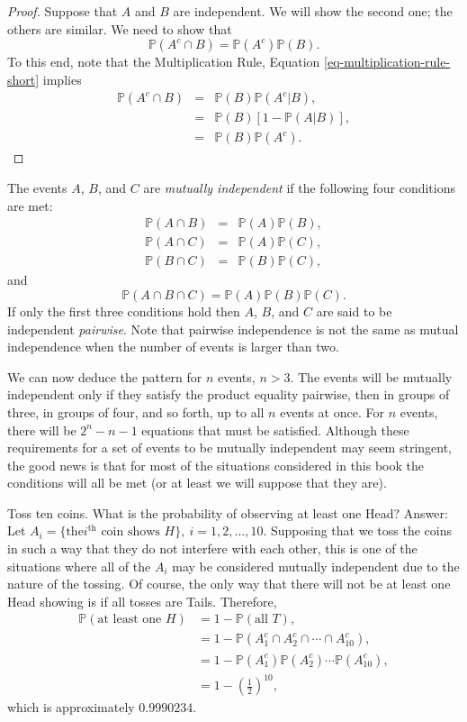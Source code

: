 \begin{proof}
Suppose that \(A\) and \(B\) are independent. We will show the second
one; the others are similar. We need to show that \[
\mathbb{P}(A^{c}\cap B)=\mathbb{P}(A^{c})\mathbb{P}(B).  \] To this
end, note that the Multiplication Rule, Equation
\eqref{eq-multiplication-rule-short} implies
\begin{eqnarray*}
\mathbb{P}(A^{c}\cap B) & = & \mathbb{P}(B)\mathbb{P}(A^{c}|B),\\
 & = & \mathbb{P}(B)[1-\mathbb{P}(A|B)],\\
 & = & \mathbb{P}(B)\mathbb{P}(A^{c}).
\end{eqnarray*}
\end{proof}

\begin{defn}
The events \(A\), \(B\), and \(C\) are \emph{mutually independent} if the
following four conditions are met:
\begin{eqnarray*}
\mathbb{P}(A\cap B) & = & \mathbb{P}(A)\mathbb{P}(B),\\
\mathbb{P}(A\cap C) & = & \mathbb{P}(A)\mathbb{P}(C),\\
\mathbb{P}(B\cap C) & = & \mathbb{P}(B)\mathbb{P}(C),
\end{eqnarray*}
and
\[
\mathbb{P}(A\cap B\cap C)=\mathbb{P}(A)\mathbb{P}(B)\mathbb{P}(C).
\]
If only the first three conditions hold then \(A\), \(B\), and \(C\)
are said to be independent \emph{pairwise}. Note that pairwise independence
is not the same as mutual independence when the number of events is
larger than two.
\end{defn}

We can now deduce the pattern for \(n\) events, \(n>3\). The events
will be mutually independent only if they satisfy the product equality
pairwise, then in groups of three, in groups of four, and so forth, up
to all \(n\) events at once. For \(n\) events, there will be
\(2^{n}-n-1\) equations that must be satisfied.
Although these requirements for a set of events to
be mutually independent may seem stringent, the good news is that for
most of the situations considered in this book the conditions will all
be met (or at least we will suppose that they are).

\label{exa-toss-ten-coins} Toss ten coins. What is the probability of
observing at least one Head? Answer: Let \(A_{i}= \{ \mbox{the
}i^{\mathrm{th}}\mbox{ coin shows }H \} ,\
i=1,2,\ldots,10\). Supposing that we toss the coins in such a way that
they do not interfere with each other, this is one of the situations
where all of the \(A_{i}\) may be considered mutually independent due
to the nature of the tossing. Of course, the only way that there will
not be at least one Head showing is if all tosses are
Tails. Therefore,
\begin{align*}
\mathbb{P}(\mbox{at least one }H) & =1-\mathbb{P}(\mbox{all }T),\\
 & =1-\mathbb{P}(A_{1}^{c}\cap A_{2}^{c}\cap\cdots\cap A_{10}^{c}),\\
 & =1-\mathbb{P}(A_{1}^{c})\mathbb{P}(A_{2}^{c})\cdots\mathbb{P}(A_{10}^{c}),\\
 & =1-\left(\frac{1}{2}\right)^{10},
\end{align*}
which is approximately \(0.9990234\).

